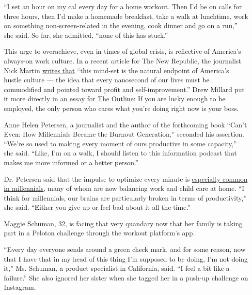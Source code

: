 ``I set an hour on my cal every day for a home workout. Then I'd be on
calls for three hours, then I'd make a homemade breakfast, take a walk
at lunchtime, work on something non-screen-related in the evening, cook
dinner and go on a run,'' she said. So far, she admitted, ``none of this
has stuck.''

This urge to overachieve, even in times of global crisis, is reflective
of America's always-on work culture. In a recent article for The New
Republic, the journalist Nick Martin
\href{https://newrepublic.com/article/156929/work-home-productivity-coronavirus-pandemic}{writes
that} ``this mind-set is the natural endpoint of America's hustle
culture --- the idea that every nanosecond of our lives must be
commodified and pointed toward profit and self-improvement.'' Drew
Millard put it more directly
\href{https://theoutline.com/post/8883/working-from-home-during-the-coronavirus-pandemic-is-not-a-recipe-for-productivity?zd=2\&zi=l5ucyfsj}{in
an essay for The Outline}: If you are lucky enough to be employed, the
only person who cares what you're doing right now is your boss.

Anne Helen Petersen, a journalist and the author of the forthcoming book
``Can't Even: How Millennials Became the Burnout Generation,'' seconded
his assertion. ``We're so used to making every moment of ours productive
in some capacity,'' she said. ``Like, I'm on a walk, I should listen to
this information podcast that makes me more informed or a better
person.''

Dr. Petersen said that the impulse to optimize every minute is
\href{https://www.nytimes3xbfgragh.onion/2019/01/26/business/against-hustle-culture-rise-and-grind-tgim.html}{especially
common in millennials}, many of whom are now balancing work and child
care at home. ``I think for millennials, our brains are particularly
broken in terms of productivity,'' she said. ``Either you give up or
feel bad about it all the time.''

Maggie Schuman, 32, is facing that very quandary now that her family is
taking part in a Peloton challenge through the workout platform's app.

``Every day everyone sends around a green check mark, and for some
reason, now that I have that in my head of this thing I'm supposed to be
doing, I'm not doing it,'' Ms. Schuman, a product specialist in
California, said. ``I feel a bit like a failure.'' She also ignored her
sister when she tagged her in a push-up challenge on Instagram.

